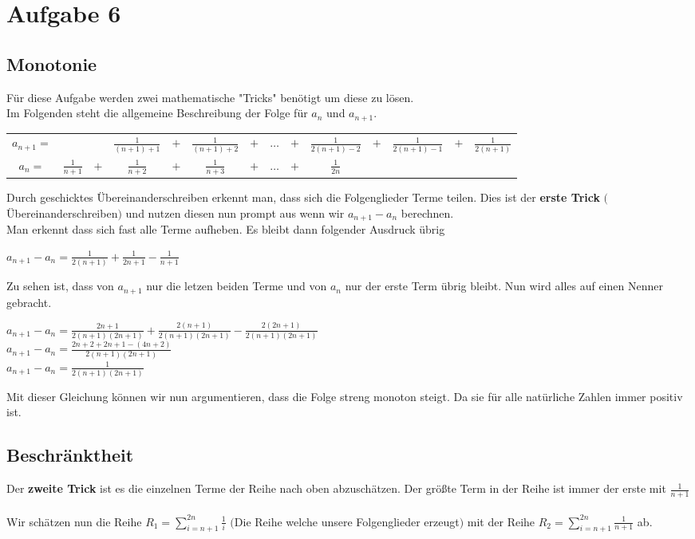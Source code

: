 \documentclass[18pt,a4paper]{article}
\begin{document}
\section*{Aufgabe 6}
\subsection*{Monotonie}
F\"ur diese Aufgabe werden zwei mathematische "Tricks" ben\"otigt um diese zu l\"osen. \\
Im Folgenden steht die allgemeine Beschreibung der Folge f\"ur $a_{n}$ und $a_{n+1}$.\\
\doublespacing
\begin{tabular}{cccccccccccccc}
		$a_{n+1} =$&& &$\frac{1}{(n+1)+1}$&$+$&$\frac{1}{(n+1)+2}$&$+$& $\dots$&$+$&$\frac{1}{2(n+1)-2}$&$+$&$\frac{1}{2(n+1)-1}$&$+$&$\frac{1}{2(n+1)}$  \\
	$a_n =$&$\frac{1}{n+1}$&$+$&$\frac{1}{n+2}$&$+$&$\frac{1}{n+3}$&$+$& $\dots$&$+$&$\frac{1}{2n}$&&  &  &  \\ 

\end{tabular} 
\singlespacing
\noindent Durch geschicktes \"Ubereinanderschreiben erkennt man, dass sich die Folgenglieder Terme teilen. Dies ist der \textbf{erste Trick} $($\"Ubereinanderschreiben$)$  und nutzen diesen nun prompt aus wenn wir $a_{n+1} - a_{n}$ berechnen.\\
Man erkennt dass sich fast alle Terme aufheben. Es bleibt dann folgender Ausdruck \"ubrig\\
\begin{center}
$a_{n+1} - a_n = \frac{1}{2(n+1)} + \frac{1}{2n +1} - \frac{1}{n+1}$\\
\end{center}
Zu sehen ist, dass von $a_{n+1} $ nur die letzen beiden Terme und von $a_n$ nur der erste Term \"ubrig bleibt. Nun wird alles auf einen Nenner gebracht.
\begin{center}
	\doublespacing
	$a_{n+1} - a_n = \frac{2n+1}{2(n+1)(2n+1)} + \frac{2(n+1)}{2(n+1)(2n+1)} - \frac{2(2n+1)}{2(n+1)(2n+1)}$\\
	$a_{n+1} - a_n = \frac{2n + 2 + 2n +1 -(4n +2)}{2(n+1)(2n+1)}$\\
		$a_{n+1} - a_n = \frac{1}{2(n+1)(2n+1)}$
\end{center}
Mit dieser Gleichung k\"onnen wir nun argumentieren, dass die Folge streng monoton steigt. Da sie f\"ur alle nat\"urliche Zahlen immer positiv ist.

\subsection*{Beschr\"anktheit}
Der \textbf{zweite Trick} ist es die einzelnen Terme der Reihe nach oben abzusch\"atzen. Der gr\"o{\ss}te Term in der Reihe ist immer der erste mit $\frac{1}{n+1}$\\
\\
Wir sch\"atzen nun die Reihe $R_1 = \displaystyle\sum_{i=n+1}^{2n} \frac{1}{i}$ $($Die Reihe welche unsere Folgenglieder erzeugt$)$ mit der Reihe $R_2 = \displaystyle\sum_{i=n+1}^{2n} \frac{1}{n+1}$ ab. 
\end{document}
